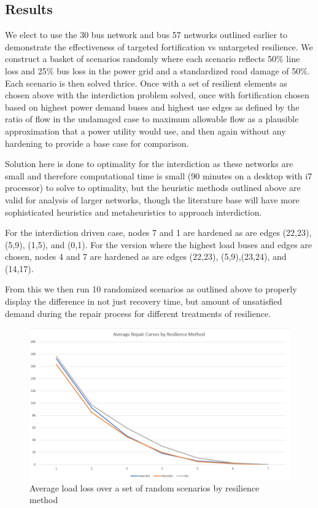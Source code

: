 \documentclass{article}
\begin{document}
	\subsection{Results}
	We elect to use the 30 bus network and bus 57 networks outlined earlier to demonstrate the effectiveness of targeted fortification vs untargeted resilience. We construct a basket of scenarios randomly where each scenario reflects 50\% line loss and 25\% bus loss in the power grid and a standardized road damage of 50\%. Each scenario is then solved thrice. Once with a set of resilient elements as chosen above with the interdiction problem solved, once with fortification chosen based on highest power demand buses and highest use edges as defined by the ratio of flow in the undamaged case to maximum allowable flow as a plausible approximation that a power utility would use, and then again without any hardening to provide a base case for comparison.
	
	Solution here is done to optimality for the interdiction as these networks are small and therefore computational time is small (90 minutes on a desktop with i7 processor) to solve to optimality, but the heuristic methods outlined above are valid for analysis of larger networks, though the literature base will have more sophisticated heuristics and metaheuristics to approach interdiction.
	
	For the interdiction driven case, nodes 7 and 1 are hardened as are edges (22,23), (5,9), (1,5), and (0,1). For the version where the highest load buses and edges are chosen, nodes 4 and 7 are hardened as are edges (22,23), (5,9),(23,24), and (14,17).
	
	From this we then run 10 randomized scenarios as outlined above to properly display the difference in not just recovery time, but amount of unsatisfied demand during the repair process for different treatments of resilience.
\begin{figure}[htbp]
	\centering
	\includegraphics[width=.9\linewidth]{AverageSpaghetti.png}
	\caption{Average load loss over a set of random scenarios by resilience method}
\end{figure}
	
\end{document}
